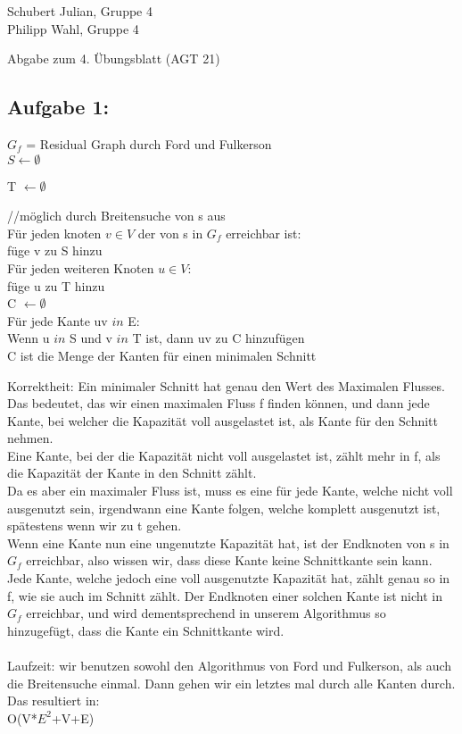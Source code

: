 \documentclass[a4paper]{article}
\begin{document}
\begin{small}
    \noindent
    Schubert Julian, Gruppe 4 \\
    Philipp Wahl, Gruppe 4
\end{small}
\bigskip

\begin{center}
    \LARGE Abgabe zum 4. Übungsblatt (AGT 21)
\end{center}
\smallskip
\subsection*{Aufgabe 1:}
$G_f$ = Residual Graph durch Ford  und  Fulkerson\\
${\displaystyle S\leftarrow \emptyset }$
  
T $\leftarrow \emptyset $

//möglich durch Breitensuche von s aus \\

Für jeden knoten $v \in V$ der von s in $G_f$ erreichbar ist:\\
\noindent\hspace*{10mm}füge v zu S hinzu \\
Für jeden weiteren Knoten $u \in V$:\\
\noindent\hspace*{10mm}
füge u zu T hinzu\\
C $\leftarrow \emptyset$\\
Für jede Kante uv $in$ E:\\
\noindent\hspace*{10mm} Wenn u $in$ S und v $in$ T ist, dann uv zu C hinzufügen\\
C ist die Menge der Kanten für einen minimalen Schnitt


Korrektheit: Ein minimaler Schnitt hat genau den Wert des Maximalen Flusses.
Das bedeutet, das wir einen maximalen Fluss f finden können, und dann jede Kante, bei welcher die Kapazität voll ausgelastet ist, als Kante für den Schnitt nehmen.\\
Eine Kante, bei der die Kapazität nicht voll ausgelastet ist, zählt mehr in f, als die Kapazität der Kante in den Schnitt zählt.\\
Da es aber ein maximaler Fluss ist, muss es eine für jede Kante, welche nicht voll ausgenutzt sein, irgendwann eine Kante folgen, welche komplett ausgenutzt ist, spätestens wenn wir zu t gehen.\\
Wenn eine Kante nun eine ungenutzte Kapazität hat, ist der Endknoten von s in $G_f$ erreichbar, also wissen wir, dass diese Kante keine Schnittkante sein kann.\\
Jede Kante, welche jedoch eine voll ausgenutzte Kapazität hat, zählt genau so in f, wie sie auch im Schnitt zählt. Der Endknoten einer solchen Kante ist nicht in $G_f$ erreichbar, und wird dementsprechend in unserem Algorithmus so hinzugefügt, dass die Kante ein Schnittkante wird.\\
\\
Laufzeit: wir benutzen sowohl den Algorithmus von Ford und Fulkerson, als auch die Breitensuche einmal. Dann gehen wir ein letztes mal durch alle Kanten durch. Das resultiert in:\\
O(V*$E^2$+V+E)
\end{document}
